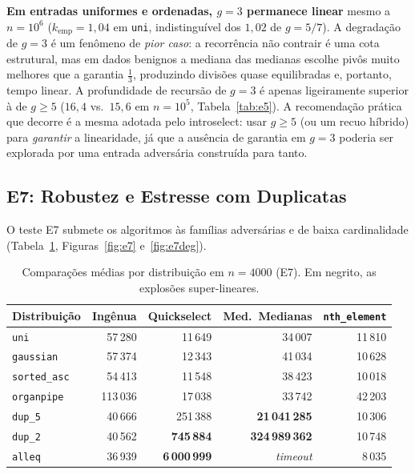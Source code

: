 \documentclass{infufrgs}
\begin{document}
\textbf{Em entradas uniformes e ordenadas, $g = 3$ permanece linear} mesmo a $n = 10^6$ ($k_\text{emp} = 1{,}04$ em \texttt{uni}, indistinguível dos $1{,}02$ de $g = 5/7$). A degradação de $g = 3$ é um fenômeno de \emph{pior caso}: a recorrência não contrair é uma cota estrutural, mas em dados benignos a mediana das medianas escolhe pivôs muito melhores que a garantia $\tfrac13$, produzindo divisões quase equilibradas e, portanto, tempo linear. A profundidade de recursão de $g = 3$ é apenas ligeiramente superior à de $g \ge 5$ ($16{,}4$ vs.\ $15{,}6$ em $n=10^5$, Tabela~\ref{tab:e5}). A recomendação prática que decorre é a mesma adotada pelo introselect: usar $g \ge 5$ (ou um recuo híbrido) para \emph{garantir} a linearidade, já que a ausência de garantia em $g = 3$ poderia ser explorada por uma entrada adversária construída para tanto.

\subsection{E7: Robustez e Estresse com Duplicatas}
\label{sec:e7}

O teste E7 submete os algoritmos às famílias adversárias e de baixa cardinalidade (Tabela~\ref{tab:e7}, Figuras~\ref{fig:e7} e~\ref{fig:e7deg}). 
\begin{table}[H]
\centering
\caption{Comparações médias por distribuição em $n = 4000$ (E7). Em negrito, as explosões super-lineares.}
\label{tab:e7}
\begin{tabular}{lrrrr}
\toprule
Distribuição & Ingênua & Quickselect & Med.\ Medianas & \texttt{nth\_element} \\
\midrule
\texttt{uni}          & 57\,280 &  11\,649 &  34\,007 & 11\,810 \\
\texttt{gaussian}     & 57\,374 &  12\,343 &  41\,034 & 10\,628 \\
\texttt{sorted\_asc}  & 54\,413 &  11\,548 &  38\,423 & 10\,018 \\
\texttt{organpipe}    & 113\,036 & 17\,038 &  33\,742 & 42\,203 \\
\texttt{dup\_5}       & 40\,666 & 251\,388 & \textbf{21\,041\,285} & 10\,306 \\
\texttt{dup\_2}       & 40\,562 & \textbf{745\,884} & \textbf{324\,989\,362} & 10\,748 \\
\texttt{alleq}        & 36\,939 & \textbf{6\,000\,999} & \emph{timeout} & 8\,035 \\
\bottomrule
\end{tabular}
\end{table}
\end{document}
